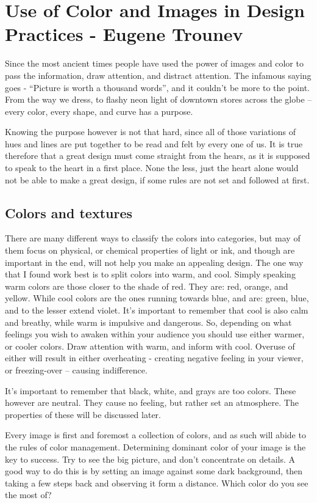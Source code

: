 \chapter{Use of Color and Images in Design Practices - Eugene Trounev}

Since the most ancient times people have used the power of images and color to pass the information, draw attention, and distract attention. The infamous saying goes - “Picture is worth a thousand words”, and it couldn't be more to the point. From the way we dress, to flashy neon light of downtown stores across the globe – every color, every shape, and curve has a purpose.

Knowing the purpose however is not that hard, since all of those variations of hues and lines are put together to be read and felt by every one of us. It is true therefore that a great design must come straight from the hears, as it is supposed to speak to the heart in a first place. None the less, just the heart alone would not be able to make a great design, if some rules are not set and followed at first.

\section*{Colors and textures}

There are many different ways to classify the colors into categories, but may of them focus on physical, or chemical properties of light or ink, and though are important in the end, will not help you make an appealing design. The one way that I found work best is to split colors into warm, and cool. Simply speaking warm colors are those closer to the shade of red. They are: red, orange, and yellow. While cool colors are the ones running towards blue, and are: green, blue, and to the lesser extend violet. It's important to remember that cool is also calm and breathy, while warm is impulsive and dangerous. So, depending on what feelings you wish to awaken within your audience you should use either warmer, or cooler colors. Draw attention with warm, and inform with cool. Overuse of either will result in either overheating - creating negative feeling in your viewer, or freezing-over – causing indifference.

It's important to remember that black, white, and grays are too colors. These however are neutral. They cause no feeling, but rather set an atmosphere. The properties of these will be discussed later.

Every image is first and foremost a collection of colors, and as such will abide to the rules of color management. Determining dominant color of your image is the key to success. Try to see the big picture, and don't concentrate on details. A good way to do this is by setting an image against some dark background, then taking a few steps back and observing it form a distance. Which color do you see the most of?

